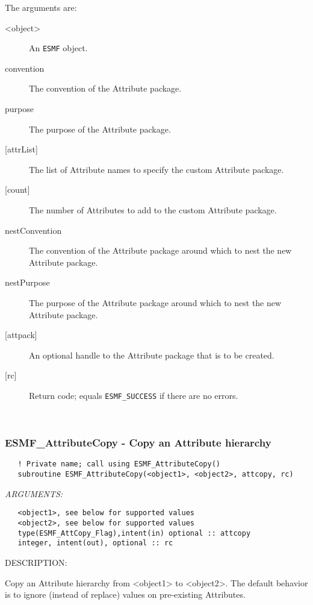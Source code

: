    The arguments are:
   \begin{description}
   \item [<object>]
   An {\tt ESMF} object.
   \item [convention]
   The convention of the Attribute package.
   \item [purpose]
   The purpose of the Attribute package.
   \item [{[attrList]}]
   The list of Attribute names to specify the custom Attribute package.
   \item [{[count]}]
   The number of Attributes to add to the custom Attribute package.
   \item [nestConvention]
   The convention of the Attribute package around which to nest
   the new Attribute package.
   \item [nestPurpose]
   The purpose of the Attribute package around which to nest the
   new Attribute package.
   \item [{[attpack]}]
   An optional handle to the Attribute package that is to be created.
   \item [{[rc]}]
   Return code; equals {\tt ESMF\_SUCCESS} if there are no errors.
   \end{description}
  
   
 
\mbox{}\hrulefill\ 
 
\subsubsection [ESMF\_AttributeCopy] {ESMF\_AttributeCopy - Copy an Attribute hierarchy}


  
\begin{verbatim}   ! Private name; call using ESMF_AttributeCopy()
   subroutine ESMF_AttributeCopy(<object1>, <object2>, attcopy, rc)\end{verbatim}{\em ARGUMENTS:}
\begin{verbatim}   <object1>, see below for supported values
   <object2>, see below for supported values
   type(ESMF_AttCopy_Flag),intent(in) optional :: attcopy
   integer, intent(out), optional :: rc\end{verbatim}
{\sf DESCRIPTION:\\ }


   Copy an Attribute hierarchy from <object1> to <object2>. The
   default behavior is to ignore (instead of replace) values on
   pre-existing Attributes.
  
